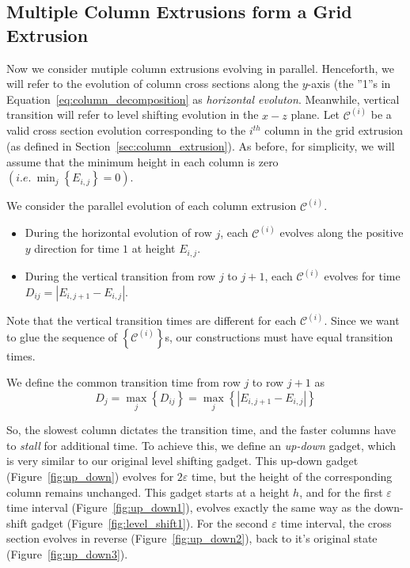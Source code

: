 \subsection{Multiple Column Extrusions form a Grid Extrusion}
\label{sec:grid_extrusion}

Now we consider mutiple column extrusions evolving in parallel.
Henceforth, we will refer to the evolution of column cross sections along the $y$-axis
(the ''1''s in Equation~\ref{eq:column_decomposition} as \emph{horizontal evoluton}.
Meanwhile, vertical transition will refer to level shifting evolution in the $x-z$ plane.
Let $\mathcal C^{(i)}$ be a valid cross section evolution corresponding
to the $i^{th}$ column in the grid extrusion (as defined in Section~\ref{sec:column_extrusion}).
As before, for simplicity, we will assume that the minimum height in each column is zero $\left( i.e.\ \min_j\left\{ E_{i,j}\right\} = 0 \right)$.

%

We consider the parallel evolution of each column extrusion $\mathcal C^{(i)}$.
\begin{itemize}
    \item During the horizontal evolution of row $j$, each $\mathcal C^{(i)}$ evolves along the positive $y$ direction for time $1$ at height $E_{i,j}$.
    \item During the vertical transition from row $j$ to $j+1$, each $\mathcal C^{(i)}$ evolves for time $ D_{ij} = \left| E_{i,j+1}-E_{i,j}\right|$.
\end{itemize}
Note that the vertical transition times are different for each $\mathcal C^{(i)}$.
Since we want to glue the sequence of $\left\{ \mathcal C^{(i)}\right\}$s, our constructions must have equal transition times.

\begin{definition}
\label{def:slowest_column}
We define the common transition time from row $j$ to row $j+1$ as
$$D_j = \max_j\left\{ D_{ij}\right\} = \max_j\left\{ \left| E_{i,j+1}-E_{i,j}\right|\right\}$$
\end{definition}

So, the slowest column dictates the transition time, and the faster columns have to \emph{stall} for additional time.
To achieve this, we define an \emph{up-down} gadget, which is very similar to our original level shifting gadget.
This up-down gadget (Figure~\ref{fig:up_down}) evolves for $2\varepsilon$ time, but the height of the corresponding column remains unchanged.
This gadget starts at a height $h$, and for the first $\varepsilon$ time interval (Figure~\ref{fig:up_down1}),
evolves exactly the same way as the down-shift gadget (Figure~\ref{fig:level_shift1}).
For the second $\varepsilon$ time interval, the cross section evolves in reverse (Figure~\ref{fig:up_down2}),
back to it's original state (Figure~\ref{fig:up_down3}).

